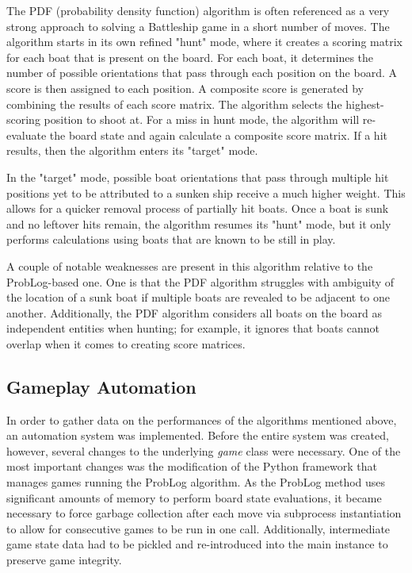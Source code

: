 \documentclass[]{article}
\begin{document}
The PDF (probability density function) algorithm is often referenced as a very strong approach to solving a Battleship game in a short number of moves. The algorithm starts in its own refined "hunt" mode, where it creates a scoring matrix for each boat that is present on the board. For each boat, it determines the number of possible orientations that pass through each position on the board. A score is then assigned to each position. A composite score is generated by combining the results of each score matrix. The algorithm selects the highest-scoring position to shoot at. For a miss in hunt mode, the algorithm will re-evaluate the board state and again calculate a composite score matrix. If a hit results, then the algorithm enters its "target" mode.

In the "target" mode, possible boat orientations that pass through multiple hit positions yet to be attributed to a sunken ship receive a much higher weight. This allows for a quicker removal process of partially hit boats. Once a boat is sunk and no leftover hits remain, the algorithm resumes its "hunt" mode, but it only performs calculations using boats that are known to be still in play.

A couple of notable weaknesses are present in this algorithm relative to the ProbLog-based one. One is that the PDF algorithm struggles with ambiguity of the location of a sunk boat if multiple boats are revealed to be adjacent to one another. Additionally, the PDF algorithm considers all boats on the board as independent entities when hunting; for example, it ignores that boats cannot overlap when it comes to creating score matrices.

\subsection{Gameplay Automation}

In order to gather data on the performances of the algorithms mentioned above, an automation system was implemented. Before the entire system was created, however, several changes to the underlying \textit{game} class were necessary. One of the most important changes was the modification of the Python framework that manages games running the ProbLog algorithm. As the ProbLog method uses significant amounts of memory to perform board state evaluations, it became necessary to force garbage collection after each move via subprocess instantiation to allow for consecutive games to be run in one call. Additionally, intermediate game state data had to be pickled and re-introduced into the main instance to preserve game integrity. 
\end{document}
